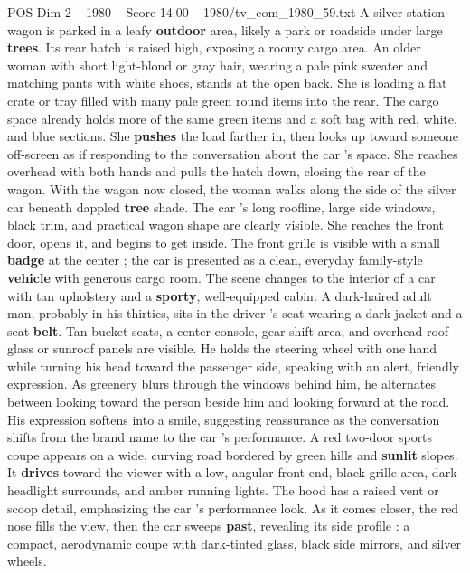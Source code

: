 \begin{textsample}{POS Dim 2 – 1980 – Score 14.00 – 1980/tv\_com\_1980\_59.txt}  \label{ex:f2_pos_070}
A silver station wagon is parked in a leafy \textbf{outdoor} area, likely a park or roadside under large \textbf{trees}.
Its rear hatch is raised high, exposing a roomy cargo area.
An older woman with short light-blond or gray hair, wearing a pale pink sweater and matching pants with white shoes, stands at the open back.
She is loading a flat crate or tray filled with many pale green round items into the rear.
The cargo space already holds more of the same green items and a soft bag with red, white, and blue sections.
She \textbf{pushes} the load farther in, then looks up toward someone off-screen as if responding to the conversation about the car ’s space.
She reaches overhead with both hands and pulls the hatch down, closing the rear of the wagon.
With the wagon now closed, the woman walks along the side of the silver car beneath dappled \textbf{tree} shade.
The car ’s long roofline, large side windows, black trim, and practical wagon shape are clearly visible.
She reaches the front door, opens it, and begins to get inside.
The front grille is visible with a small \textbf{badge} at the center ; the car is presented as a clean, everyday family-style \textbf{vehicle} with generous cargo room.
The scene changes to the interior of a car with tan upholstery and a \textbf{sporty}, well-equipped cabin.
A dark-haired adult man, probably in his thirties, sits in the driver ’s seat wearing a dark jacket and a seat \textbf{belt}.
Tan bucket seats, a center console, gear shift area, and overhead roof glass or sunroof panels are visible.
He holds the steering wheel with one hand while turning his head toward the passenger side, speaking with an alert, friendly expression.
As greenery blurs through the windows behind him, he alternates between looking toward the person beside him and looking forward at the road.
His expression softens into a smile, suggesting reassurance as the conversation shifts from the brand name to the car ’s performance.
A red two-door sports coupe appears on a wide, curving road bordered by green hills and \textbf{sunlit} slopes.
It \textbf{drives} toward the viewer with a low, angular front end, black grille area, dark headlight surrounds, and amber running lights.
The hood has a raised vent or scoop detail, emphasizing the car ’s performance look.
As it comes closer, the red nose fills the view, then the car sweeps \textbf{past}, revealing its side profile : a compact, aerodynamic coupe with dark-tinted glass, black side mirrors, and silver wheels.

\end{textsample}

